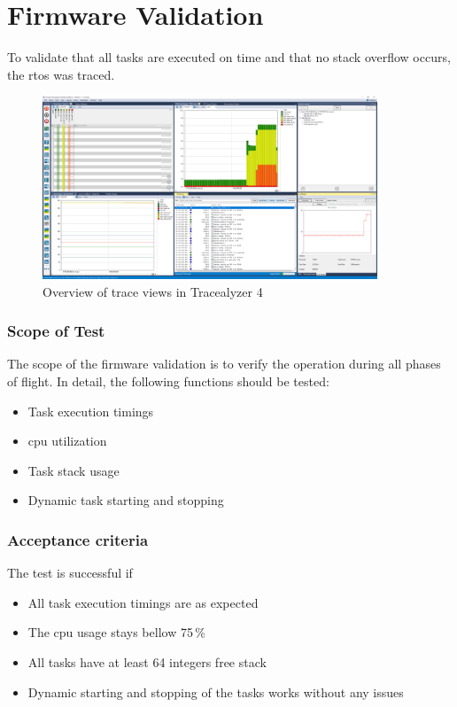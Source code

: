 \newpage

\section{Firmware Validation}
To validate that all tasks are executed on time and that no stack overflow occurs, the \acrshort{rtos} was traced.

\begin{figure}[h!]
    \centering
	\includegraphics[width=10cm]{images/tracealyzer}
	\caption{Overview of trace views in Tracealyzer 4}
	\label{fig:tracealyzer}
\end{figure}

\subsubsection{Scope of Test}
The scope of the firmware validation is to verify the operation during all phases of flight. In detail, the following functions should be tested:
\begin{itemize}
    \item Task execution timings
    \item \acrshort{cpu} utilization
    \item Task stack usage
    \item Dynamic task starting and stopping
\end{itemize}

\subsubsection{Acceptance criteria}
The test is successful if
\begin{itemize}
    \item All task execution timings are as expected
    \item The \acrshort{cpu} usage stays bellow 75\,\%
    \item All tasks have at least 64 integers free stack
    \item Dynamic starting and stopping of the tasks works without any issues
\end{itemize}

